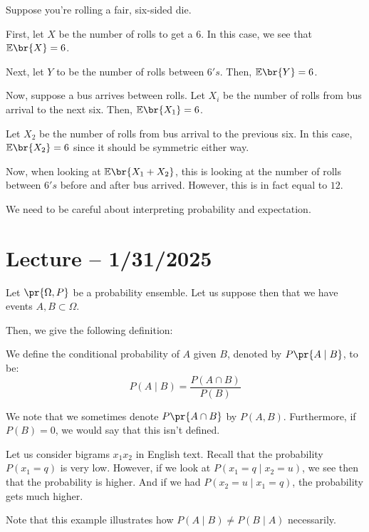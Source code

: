 \documentclass[openany]{book}
\begin{document}
\begin{example}
	Suppose you're rolling a fair, six-sided die.
	
	First, let $X$ be the number of rolls to get a $6$. In this case, we see that $\mathbb E \br{X} = 6$.
	
	Next, let $Y$ to be the number of rolls between $6's$. Then, $\mathbb E\br{Y} = 6$.
	
	Now, suppose a bus arrives between rolls. Let $X_i$ be the number of rolls from bus arrival to the next six. Then, $\mathbb E \br{X_1} = 6$.
	
	Let $X_2$ be the number of rolls from bus arrival to the previous six. In this case, $\mathbb E \br{X_2} = 6$ since it should be symmetric either way. 
	
	Now, when looking at $\mathbb E\br{X_1 + X_2}$, this is looking at the number of rolls between $6's$ before and after bus arrived. However, this is in fact equal to $12$.
\end{example}
\begin{rmk}
	We need to be careful about interpreting probability and expectation.
\end{rmk}

\section{Lecture -- 1/31/2025}
Let $\pr{\Omega, P}$ be a probability ensemble. Let us suppose then that we have events $A, B \subset \Omega$.

Then, we give the following definition:
\begin{defn}
	We define the conditional probability of $A$ given $B$, denoted by $P\pr{A \mid B}$, to be:
	\begin{equation*}
		P(A \mid B) = \frac{P(A \cap B)}{P(B)}
	\end{equation*}
\end{defn}

We note that we sometimes denote $P\pr{A \cap B}$ by $P(A, B)$. Furthermore, if $P(B) = 0$, we would say that this isn't defined.

\begin{example}[Bigrams]
	Let us consider bigrams $x_1x_2$ in English text. Recall that the probability $P(x_1 = q)$ is very low. However, if we look at $P(x_1 = q \mid x_2 = u)$, we see then that the probability is higher. And if we had $P(x_2 = u \mid x_1 = q)$, the probability gets much higher.
	
	Note that this example illustrates how $P(A \mid B) \neq P(B \mid A)$ necessarily.
\end{example}
\end{document}
